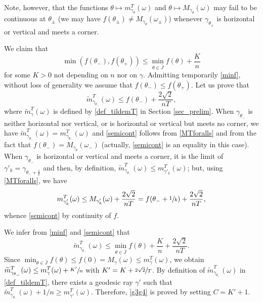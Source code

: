 \documentclass[JEP,XML,SOM,Unicode, NoEqCountersInSection,NoFloatCountersInSection,published]{cedram}
\theoremstyle{definition}
\begin{document}
Note, however, that the functions $\theta\mapsto m_{\gamma_\theta}^T(\omega)$ and $\theta\mapsto M_{\gamma_\theta}(\omega)$ may fail to be continuous at $\theta_\pm$ (\ie we may have $f(\theta_\pm)\neq M_{\gamma_\theta}(\omega_\pm)$) whenever $\gamma_{\theta_\pm}$ is horizontal or vertical and meets a corner.

We claim that
\begin{equation} \label{minf}
\min(f(\theta_-), f(\theta_+)) \leq \min_{\theta\in\bar J} f(\theta) +\frac{K}{n}
\end{equation}
for some $K>0$ not depending on $n$ nor on $\gamma$.
Admitting temporarily \eqref{minf}, without loss of generality we assume that $f(\theta_-) \leq f(\theta_+ )$.
Let us prove that
\begin{equation} \label{semicont}
\widetilde m^T_{\gamma_{\theta_-}}(\omega) \leq f(\theta_-) + \frac{2 \sqrt{2}}{nT},
\end{equation}
where $\widetilde m^T_{\gamma}(\omega)$ is defined by \eqref{def_tildemT} in Section \ref{sec_prelim}.
When $\gamma_{\theta_-}$ is neither horizontal nor vertical, or is horizontal or vertical but meets no corner, we have $\widetilde m^T_{\gamma_{\theta_-}}(\omega) = m^T_{\gamma_{\theta_-}}(\omega)$ and \eqref{semicont} follows from \eqref{MTforalls} and from the fact that $f(\theta_-) = M_{\gamma_\theta}(\omega_-)$ (actually, \eqref{semicont} is an equality in this case).
When $\gamma_{\theta_-}$ is horizontal or vertical and meets a corner, it is the limit of $\gamma'_k = \gamma_{\theta_- + \frac{1}{k}}$ and then, by definition, $\widetilde m^T_{\gamma_{\theta_-}}(\omega) \leq m_{\gamma'_k}^T(\omega)$; but, using \eqref{MTforalls}, we have
\[
m_{\gamma'_k}^T(\omega) \leq M_{\gamma'_k}(\omega)+\frac{2\sqrt{2}}{nT} = f(\theta_-+\sfrac{1}{k})+\frac{2\sqrt{2}}{nT},
\]
whence \eqref{semicont} by continuity of $f$.

We infer from \eqref{minf} and \eqref{semicont} that
\[
\widetilde m^T_{\gamma_{\theta_-}}(\omega) \leq \min_{\theta\in\bar J} f(\theta) +\frac{K}{n} + \frac{2 \sqrt{2}}{nT}.
\]
Since $\min_{\theta\in\bar J} f(\theta) \leq f(0) = M_{\gamma}(\omega) \leq m^T_\gamma(\omega)$, we obtain
$\widetilde m^T_{\gamma_{\theta_-}}(\omega) \leq m^T_\gamma(\omega) +\sfrac{K'}{n}$
with $K'= K +\sfrac{2 \sqrt{2}}{T}$. By definition of $\widetilde m^T_{\gamma_{\theta_-}}(\omega)$ in \eqref{def_tildemT}, there exists a geodesic ray $\gamma'$ such that $\widetilde m^T_{\gamma_{\theta_-}}(\omega)+1/n \geq m^T_{\gamma'}(\omega)$.
Therefore, \eqref{g3g4} is proved by setting $C=K'+1$.
\end{document}
